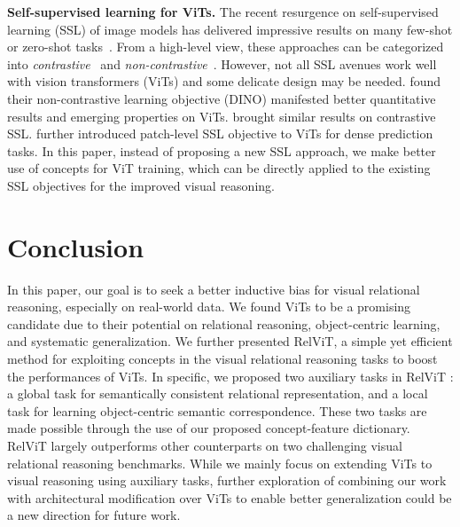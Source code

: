 \documentclass{article} \usepackage{iclr2022_conference,times}
\renewcommand{\paragraph}[1]{\noindent\textbf{#1.}}
\newcommand{\relvit}{RelViT }
\begin{document}
\paragraph{Self-supervised learning for ViTs} The recent resurgence on self-supervised learning (SSL) of image models has delivered impressive results on many few-shot or zero-shot tasks~\citep{cpc}. From a high-level view, these approaches can be categorized into \textit{contrastive}~\citep{moco,simclr} and \textit{non-contrastive}~\citep{simsiam}. However, not all SSL avenues work well with vision transformers (ViTs) and some delicate design may be needed. \cite{dino} found their non-contrastive learning objective (DINO) manifested better quantitative results and emerging properties on ViTs. \cite{mocov3} brought similar results on contrastive SSL. \cite{esvit} further introduced patch-level SSL objective to ViTs for dense prediction tasks. In this paper, instead of proposing a new SSL approach, we make better use of concepts for ViT training, which can be directly applied to the existing SSL objectives for the improved visual reasoning.

\vspace{-8pt}
\section{Conclusion}
\label{sec:conclusion}
\vskip-0.1in
In this paper, our goal is to seek a better inductive bias for visual relational reasoning, especially on real-world data. We found ViTs to be a promising candidate due to their potential on relational reasoning, object-centric learning, and systematic generalization. We further presented RelViT, a simple yet efficient method for exploiting concepts in the visual relational reasoning tasks to boost the performances of ViTs. In specific, we proposed two auxiliary tasks in \relvit: a global task for semantically consistent relational representation, and a local task for learning object-centric semantic correspondence. These two tasks are made possible through the use of our proposed concept-feature dictionary. RelViT largely outperforms other counterparts on two challenging visual relational reasoning benchmarks. While we mainly focus on extending ViTs to visual reasoning using auxiliary tasks, further exploration of combining our work with architectural modification over ViTs to enable better generalization could be a new direction for future work.






\end{document}
